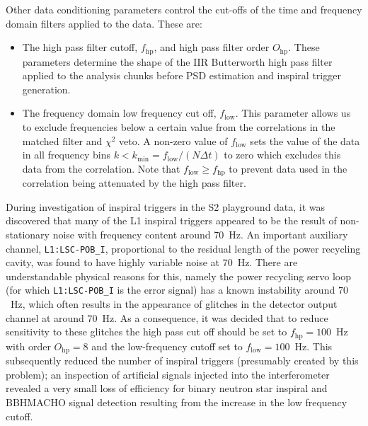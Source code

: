 Other data conditioning parameters control the cut-offs of the time
and frequency domain filters applied to the data. These are:
\begin{itemize}
\item The high pass filter cutoff, $f_\mathrm{hp}$, and high pass filter
order $O_\mathrm{hp}$. These parameters determine the shape of the IIR
Butterworth high pass filter applied to the analysis chunks before PSD
estimation and inspiral trigger generation.

\item The frequency domain low frequency cut off, $f_\mathrm{low}$. This
parameter allows us to exclude frequencies below a certain value from the
correlations in the matched filter and $\chi^2$ veto. A non-zero value of
$f_\mathrm{low}$ sets the value of the data in all frequency bins $k <
k_\mathrm{min} = f_\mathrm{low} / (N \Delta t)$ to zero which excludes this
data from the correlation. Note that $f_\mathrm{low} \ge f_\mathrm{hp}$ to
prevent data used in the correlation being attenuated by the high pass
filter.
\end{itemize}
During investigation of inspiral triggers in the S2 playground data, it was
discovered that many of the L1 inspiral triggers appeared to be the result of
non-stationary noise with frequency content around $70$~Hz.  An important
auxiliary channel, \texttt{L1:LSC-POB\_I}, proportional to the residual length
of the power recycling cavity, was found to have highly variable noise at
$70$~Hz.  There are understandable physical reasons for this, namely the power
recycling servo loop (for which \texttt{L1:LSC-POB\_I} is the error signal)
has a known instability around $70$~Hz, which often results in the appearance
of glitches in the detector output channel at around $70$~Hz.  As a
consequence, it was decided that to reduce sensitivity to these glitches the
high pass cut off should be set to $f_\mathrm{hp} = 100$~Hz with order
$O_\mathrm{hp} = 8$ and the low-frequency cutoff set to $f_\mathrm{low} =
100$~Hz.  This subsequently reduced the number of inspiral triggers
(presumably created by this problem); an inspection of artificial signals
injected into the interferometer revealed a very small loss of efficiency for
binary neutron star inspiral and BBHMACHO signal detection resulting from the
increase in the low frequency cutoff.

